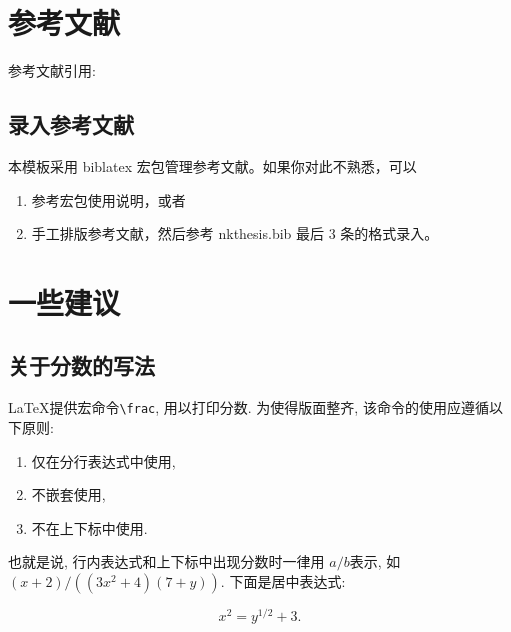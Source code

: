 \section{参考文献} \label{manual:ref}
参考文献引用:
\cite{ChenCheChen2001,Nadkarni-1992,Hua-Wang-1973}
\cite{ZhuKeZhen,Huo,Example}\cite{JiangXiZhou,Timoshenko,Zhang-Wang,Ding,GB6447-86}
\cite[Theorem 2.1]{ZhuKeZhen}

\subsection{录入参考文献}

本模板采用 biblatex 宏包管理参考文献。如果你对此不熟悉，可以
\begin{enumerate}
\item 参考宏包使用说明，或者
\item 手工排版参考文献，然后参考 nkthesis.bib 最后 3 条的格式录入。
\end{enumerate}



\section{一些建议}
\subsection{关于分数的写法}


\LaTeX 提供宏命令\verb+\frac+, 用以打印分数. 为使得版面整齐, 该命令的使用应遵循以下原则:

\begin{enumerate}
\item 仅在分行表达式中使用,
\item 不嵌套使用,
\item 不在上下标中使用.
\end{enumerate}

也就是说, 行内表达式和上下标中出现分数时一律用 $a/b$表示, 如
$(x+2)/((3x^2+4)(7+y))$. 下面是居中表达式:

\[
 x^2 = y^{1/2} +3.
\]

